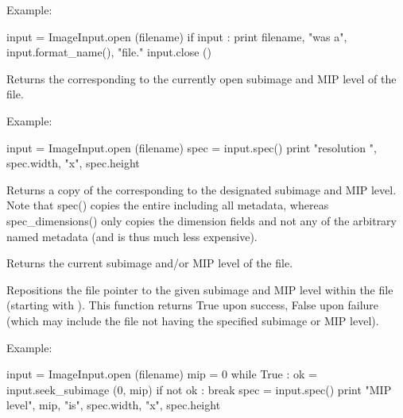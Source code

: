 \noindent Example:
\begin{code}
    input = ImageInput.open (filename)
    if input :
        print filename, "was a", input.format_name(), "file."
        input.close ()
  
\end{code}
\apiend

Returns the \ImageSpec corresponding to the currently open subimage and
MIP level of the file.

\noindent Example:
\begin{code}
    input = ImageInput.open (filename)
    spec = input.spec()
    print "resolution ", spec.width, "x", spec.height
\end{code}
\apiend

Returns a copy of the \ImageSpec corresponding to the designated subimage
and MIP level. Note that {\cf spec()} copies the entire \ImageSpec including
all metadata, whereas {\cf spec_dimensions()} only copies the dimension
fields and not any of the arbitrary named metadata (and is thus much less
expensive).
\apiend

Returns the current subimage and/or MIP level of the file.
\apiend

Repositions the file pointer to the given subimage and MIP level within the
file (starting with {}).  This function returns {\cf True} upon success,
{\cf False} upon failure (which may include the file not having the
specified subimage or MIP level).

\noindent Example:
\begin{code}
    input = ImageInput.open (filename)
    mip = 0
    while True :
        ok = input.seek_subimage (0, mip)
        if not ok :
            break
        spec = input.spec()
        print "MIP level", mip, "is", spec.width, "x", spec.height
\end{code}
\apiend


